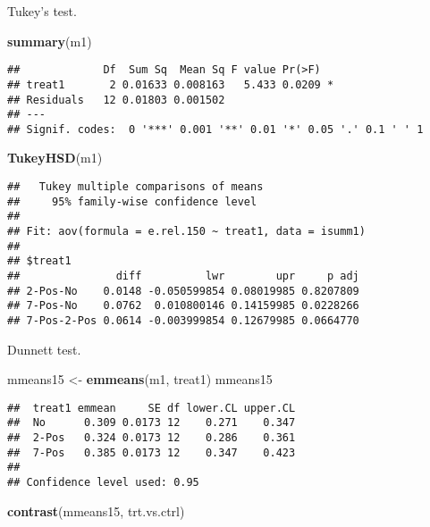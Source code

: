 \documentclass[
]{article}
\newenvironment{Shaded}{\begin{snugshade}}{\end{snugshade}}
\newcommand{\FunctionTok}[1]{\textcolor[rgb]{0.13,0.29,0.53}{\textbf{#1}}}
\newcommand{\NormalTok}[1]{#1}
\newcommand{\OtherTok}[1]{\textcolor[rgb]{0.56,0.35,0.01}{#1}}
\newcommand{\StringTok}[1]{\textcolor[rgb]{0.31,0.60,0.02}{#1}}
\begin{document}
Tukey's test.

\begin{Shaded}
\begin{Highlighting}[]
\FunctionTok{summary}\NormalTok{(m1)}
\end{Highlighting}
\end{Shaded}

\begin{verbatim}
##             Df  Sum Sq  Mean Sq F value Pr(>F)  
## treat1       2 0.01633 0.008163   5.433 0.0209 *
## Residuals   12 0.01803 0.001502                 
## ---
## Signif. codes:  0 '***' 0.001 '**' 0.01 '*' 0.05 '.' 0.1 ' ' 1
\end{verbatim}

\begin{Shaded}
\begin{Highlighting}[]
\FunctionTok{TukeyHSD}\NormalTok{(m1)}
\end{Highlighting}
\end{Shaded}

\begin{verbatim}
##   Tukey multiple comparisons of means
##     95% family-wise confidence level
## 
## Fit: aov(formula = e.rel.150 ~ treat1, data = isumm1)
## 
## $treat1
##               diff          lwr        upr     p adj
## 2-Pos-No    0.0148 -0.050599854 0.08019985 0.8207809
## 7-Pos-No    0.0762  0.010800146 0.14159985 0.0228266
## 7-Pos-2-Pos 0.0614 -0.003999854 0.12679985 0.0664770
\end{verbatim}

Dunnett test.

\begin{Shaded}
\begin{Highlighting}[]
\NormalTok{mmeans15 }\OtherTok{\textless{}{-}} \FunctionTok{emmeans}\NormalTok{(m1, }\StringTok{\textquotesingle{}treat1\textquotesingle{}}\NormalTok{)}
\NormalTok{mmeans15}
\end{Highlighting}
\end{Shaded}

\begin{verbatim}
##  treat1 emmean     SE df lower.CL upper.CL
##  No      0.309 0.0173 12    0.271    0.347
##  2-Pos   0.324 0.0173 12    0.286    0.361
##  7-Pos   0.385 0.0173 12    0.347    0.423
## 
## Confidence level used: 0.95
\end{verbatim}

\begin{Shaded}
\begin{Highlighting}[]
\FunctionTok{contrast}\NormalTok{(mmeans15, }\StringTok{\textquotesingle{}trt.vs.ctrl\textquotesingle{}}\NormalTok{)}
\end{Highlighting}
\end{Shaded}
\end{document}
